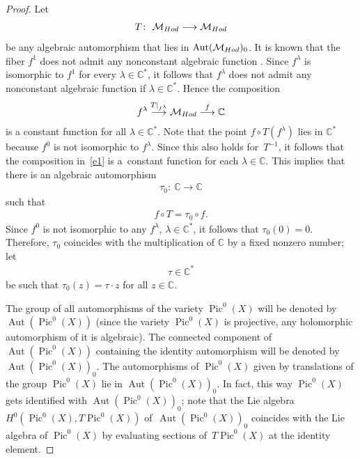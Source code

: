 \documentclass[11pt]{article}
\numberwithin{equation}{section}
\begin{document}
\begin{proof} Let
\begin{gather*}
T \colon \ {\mathcal M}_{\rm Hod} \longrightarrow {\mathcal M}_{\rm Hod}
\end{gather*}
be any algebraic automorphism that lies in $\operatorname{Aut}({\mathcal M}_{\rm Hod})_0$. It is known that the f\/iber $f^1$ does not admit any nonconstant algebraic function \cite[Proposition~2.2]{BBS}. Since $f^\lambda$ is isomorphic to $f^1$ for every $\lambda \in {\mathbb C}^*$, it follows that $f^\lambda$ does not admit any nonconstant algebraic function if $\lambda \in {\mathbb C}^*$. Hence the composition
\begin{gather}\label{e1}
f^\lambda \stackrel{T\vert_{f^\lambda}}{\longrightarrow} {\mathcal M}_{\rm Hod} \stackrel{f}{\longrightarrow} \mathbb C
\end{gather}
is a constant function for all $\lambda \in {\mathbb C}^*$. Note that the point $f\circ T(f^{\lambda})$ lies in ${\mathbb C}^*$ because $f^0$ is not isomorphic to $f^\lambda$. Since this also holds for~$T^{-1}$, it follows that the composition in~\eqref{e1} is a~constant function for each $\lambda \in {\mathbb C}$. This implies that there is an algebraic automorphism
\begin{gather*}
\tau_0 \colon \ {\mathbb C} \longrightarrow \mathbb C
\end{gather*}
such that
\begin{gather*}
f\circ T = \tau_0 \circ f .
\end{gather*}
Since $f^0$ is not isomorphic to any $f^\lambda$, $\lambda \in {\mathbb C}^*$, it follows that $\tau_0(0) = 0$. Therefore, $\tau_0$ coincides with the multiplication of $\mathbb C$ by a f\/ixed nonzero number; let
\begin{gather}\label{e4}
\tau \in {\mathbb C}^*
\end{gather}
be such that $\tau_0(z) = \tau \cdot z$ for all $z \in \mathbb C$.

The group of all automorphisms of the variety $\operatorname{Pic}^0(X)$ will be denoted by $\operatorname{Aut}(\operatorname{Pic}^0(X))$ (since the variety $\operatorname{Pic}^0(X)$ is projective, any holomorphic automorphism of it is algebraic). The connected component of~$\operatorname{Aut}(\operatorname{Pic}^0(X))$ containing the identity automorphism will be denoted by~$\operatorname{Aut}(\operatorname{Pic}^0(X))_0$. The automorphisms of $\operatorname{Pic}^0(X)$ given by translations of the group $\operatorname{Pic}^0(X)$ lie in $\operatorname{Aut}(\operatorname{Pic}^0(X))_0$. In fact, this way $\operatorname{Pic}^0(X)$ gets identif\/ied with
$\operatorname{Aut}(\operatorname{Pic}^0(X))_0$; note that the Lie algebra $H^0(\operatorname{Pic}^0(X), T\operatorname{Pic}^0(X))$ of~$\operatorname{Aut}(\operatorname{Pic}^0(X))_0$ coincides with the Lie algebra of $\operatorname{Pic}^0(X)$ by evaluating sections of~$T\operatorname{Pic}^0(X)$ at the identity element.


\end{proof}
\end{document}
